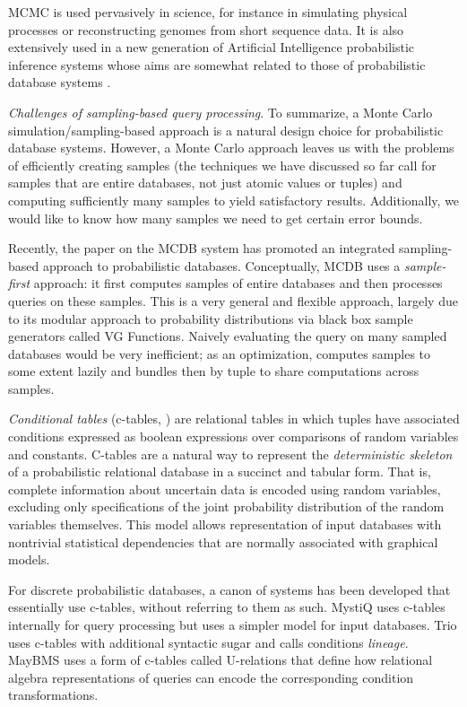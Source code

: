 MCMC is used pervasively in science, for instance in simulating  physical processes  or reconstructing  genomes  from short sequence data.  It is also extensively used in a new generation of Artificial Intelligence probabilistic inference systems whose aims are somewhat related to those of probabilistic database systems \cite{RD2006, BLOG}.

{\em Challenges  of sampling-based query processing}\/.  To  summarize, a Monte Carlo simulation/sampling-based approach is  a  natural  design  choice  for  probabilistic  database  systems. However,  a  Monte Carlo  approach  leaves  us  with the  problems  of efficiently creating samples (the  techniques we have discussed so far call for samples that are  entire databases, not just atomic values or tuples) and computing sufficiently  many samples to yield satisfactory results.  Additionally, we would like to know how many samples we need to get certain error bounds.


Recently,  the paper  \cite{MCDB} on  the MCDB  system  has promoted an integrated  sampling-based  approach to  probabilistic databases.  Conceptually,  MCDB uses a {\em sample-first}\/ approach: it   first  computes  samples  of  entire databases and then processes queries  on these samples.  This is a very general and flexible approach, largely due to its modular approach to probability distributions via black box sample generators called VG Functions.  Naively evaluating the query on many sampled databases would be very inefficient; as an optimization, computes samples to some extent lazily and bundles then by tuple to share computations across samples.  

{\em  Conditional tables}\/  (c-tables, \cite{IL1984})  are relational tables in which tuples have associated conditions expressed as boolean expressions over  comparisons of random variables  and constants. C-tables are a natural way to  represent  the  {\em  deterministic skeleton}\/  of a probabilistic relational  database in  a succinct  and tabular  form.  That  is, complete information  about uncertain data is encoded using random  variables, excluding only  specifications  of the  joint  probability  distribution of  the random  variables   themselves.   This  model   allows  representation of  input databases  with  nontrivial statistical  dependencies that are normally associated with graphical models. 

For discrete probabilistic  databases, a canon of systems has been developed that essentially use c-tables, without referring to them as such. MystiQ  \cite{dalvi07efficient}  uses  c-tables internally  for  query processing  but  uses  a  simpler  model for  input  databases.   Trio \cite{WidomTrio2008}  uses  c-tables with  additional  syntactic sugar  and calls conditions {\em lineage}\/.  MayBMS \cite{AJKO2008}  uses a  form of  c-tables called  U-relations that define how relational algebra representations of queries can encode the corresponding condition transformations.


